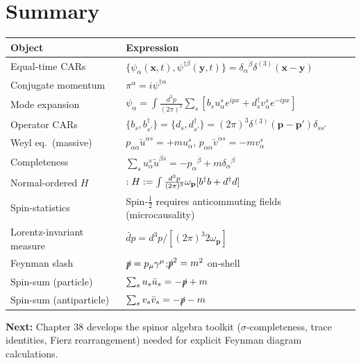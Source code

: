 
\section{Summary}

\begin{center}
\renewcommand{\arraystretch}{1.5}
\begin{tabular}{@{}ll@{}}
  \toprule
  Object & Expression \\
  \midrule
  Equal-time CARs & $\{\psi_\alpha(\mathbf{x},t),\psi^{\dagger\dot\beta}(\mathbf{y},t)\}
    = \delta_\alpha{}^{\dot\beta}\delta^{(3)}(\mathbf{x}-\mathbf{y})$ \\
  Conjugate momentum & $\pi^\alpha = i\psi^{\dagger\alpha}$ \\
  Mode expansion & $\psi_\alpha = \int\frac{d^3p}{(2\pi)^3}\sum_s
    [b_s u^s_\alpha e^{ipx} + d^\dagger_s v^s_\alpha e^{-ipx}]$ \\
  Operator CARs & $\{b_s,b^\dagger_{s'}\} = \{d_s,d^\dagger_{s'}\}
    = (2\pi)^3\delta^{(3)}(\mathbf{p}-\mathbf{p}')\delta_{ss'}$ \\
  Weyl eq.\ (massive) & $p_{\alpha\dot\alpha}\tilde u^{\dot\alpha s} = +m u^s_\alpha$,\quad
    $p_{\alpha\dot\alpha}\tilde v^{\dot\alpha s} = -m v^s_\alpha$ \\
  Completeness & $\sum_s u^s_\alpha\tilde u^{\dot\beta s} = -p_\alpha{}^{\dot\beta} + m\delta_\alpha{}^{\dot\beta}$ \\
  Normal-ordered $H$ & $:H: = \int\frac{d^3p}{(2\pi)^3}\omega_{\mathbf{p}}[b^\dagger b + d^\dagger d]$ \\
  Spin-statistics & Spin-$\frac{1}{2}$ requires anticommuting fields (microcausality) \\
  Lorentz-invariant measure & $\widetilde{dp} = d^3p/[(2\pi)^3 2\omega_{\mathbf{p}}]$ \\
  Feynman slash & $\slashed{p}=p_\mu\gamma^\mu$;\quad $\slashed{p}^2=m^2$ on-shell \\
  Spin-sum (particle) & $\sum_s u_s\bar u_s = -\slashed{p}+m$ \\
  Spin-sum (antiparticle) & $\sum_s v_s\bar v_s = -\slashed{p}-m$ \\
  \bottomrule
\end{tabular}
\end{center}

\bigskip
\noindent\textbf{Next:} Chapter 38 develops the spinor algebra toolkit
($\sigma$-completeness, trace identities, Fierz rearrangement) needed for
explicit Feynman diagram calculations.
